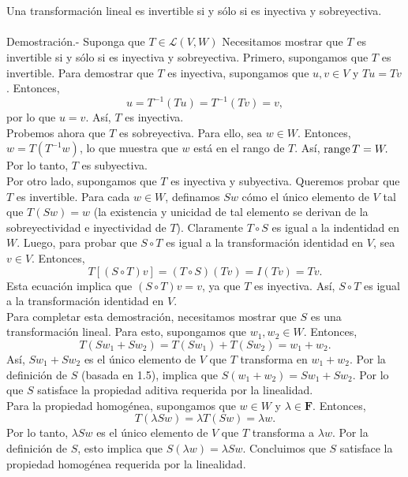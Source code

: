 \begin{myteo}\,\\\\
    Una transformación lineal es invertible si y sólo si es inyectiva y sobreyectiva.\\\\
	Demostración.-\; Suponga que $T\in \mathcal{L}(V,W)$ Necesitamos mostrar que $T$ es invertible si y sólo si es inyectiva y sobreyectiva. Primero, supongamos que $T$ es invertible. Para demostrar que $T$ es inyectiva, supongamos que $u,v\in V$ y $Tu=Tv$. Entonces,
	$$u=T^{-1}\left(Tu\right)=T^{-1}\left(Tv\right)=v,$$
	por lo que $u=v$. Así, $T$ es inyectiva. \\
	Probemos ahora que $T$ es sobreyectiva. Para ello, sea $w\in W$. Entonces, $w=T\left(T^{-1}w\right)$, lo que muestra que $w$ está en el rango de $T$. Así, $\operatorname{range} T= W.$ Por lo tanto, $T$ es subyectiva.\\

	Por otro lado, supongamos que $T$ es inyectiva y subyectiva. Queremos probar que $T$ es invertible. Para cada $w\in W$, definamos $Sw$ cómo el único elemento de $V$ tal que $T(Sw)=w$ (la existencia y unicidad de tal elemento se derivan de la sobreyectividad e inyectividad de $T$). Claramente $T\circ S$ es igual a la indentidad en $W$. Luego, para probar que $S\circ T$ es igual a la transformación identidad en $V$, sea $v\in V$. Entonces,
	$$T\left[(S\circ T)v\right] = (T\circ S)(Tv)=I(Tv)=Tv.$$
	Esta ecuación implica que $(S\circ T)v=v$, ya que $T$ es inyectiva. Así, $S\circ T$ es igual a la transformación identidad en $V$. \\
	Para completar esta demostración, necesitamos mostrar que $S$ es una transformación lineal. Para esto, supongamos que $w_1,w_2\in W$. Entonces,
	$$T(Sw_1+Sw_2)=T(Sw_1)+T(Sw_2)=w_1+w_2.$$
	Así, $Sw_1+Sw_2$ es el único elemento de $V$ que $T$ transforma en $w_1+w_2$. Por la definición de $S$ (basada en 1.5), implica que $S(w_1+w_2)=Sw_1+Sw_2$. Por lo que $S$ satisface la propiedad aditiva requerida por la linealidad.\\
	Para la propiedad homogénea, supongamos que $w\in W$ y $\lambda \in \textbf{F}$. Entonces,
	$$T(\lambda Sw) = \lambda T(Sw)=\lambda w.$$
	Por lo tanto, $\lambda Sw$ es el único elemento de $V$ que $T$ transforma a $\lambda w$. Por la definición de $S$, esto implica que $S(\lambda w)=\lambda Sw$. Concluimos que $S$ satisface la propiedad homogénea requerida por la linealidad.
\end{myteo}

